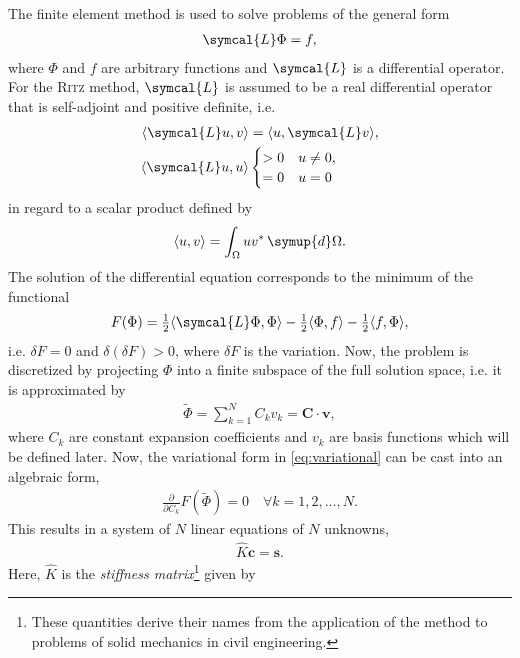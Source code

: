 \documentclass[a4paper, twoside, 10pt, english]{article}
\numberwithin{equation}{section}
\let\vec\symbf
\newcommand*\pd[2][]{\ensuremath{\frac{\partial #1}{\partial #2}}}  %
\begin{document}
The finite element method is used to solve problems of the general form
\begin{gather}
  \symcal{L} \Phi = f, \label{eq:fem}
\end{gather}
where $\Phi$ and $f$ are arbitrary functions and $\symcal{L}$ is a differential operator. For the \textsc{Ritz} method, $\symcal{L}$ is assumed to be a real differential operator that is self-adjoint and positive definite, i.e.
\begin{align}
  \langle \symcal{L} u, v \rangle &= \langle u, \symcal{L} v \rangle, \label{eq:self-adjoint} \\
  \langle \symcal{L} u, u \rangle & \begin{cases}
    > 0 & u \neq 0, \\
    = 0 & u = 0
  \end{cases} \label{eq:positive_definite}
\end{align}
in regard to a scalar product defined by
\begin{gather}
  \langle u, v \rangle = \int_{\Omega} u v^{*} \, \symup{d} \Omega. \label{eq:scalar_prod}
\end{gather}
The solution of the differential equation corresponds to the minimum of the functional
\begin{gather}
  F(\Phi) = \tfrac{1}{2} \langle \symcal{L} \Phi, \Phi \rangle - \tfrac{1}{2} \langle \Phi, f \rangle - \tfrac{1}{2} \langle f, \Phi \rangle, \label{eq:variational}
\end{gather}
i.e. $\delta F = 0$ and $\delta (\delta F) > 0$, where $\delta F$ is the variation. Now, the problem is discretized by projecting $\Phi$ into a finite subspace of the full solution space, i.e. it is approximated by
\begin{gather}
  \tilde{\Phi} = \sum_{k = 1}^{N} C_{k} v_{k} = \vec{C} \cdot \vec{v},
\end{gather}
where $C_{k}$ are constant expansion coefficients and $v_{k}$ are basis functions which will be defined later. Now, the variational form in \cref{eq:variational} can be cast into an algebraic form,
\begin{gather}
  \pd{C_{k}} F(\tilde{\Phi}) = 0 \quad \forall k = 1, 2, \dotsc, N.
\end{gather}
This results in a system of $N$ linear equations of $N$ unknowns,
\begin{gather}
  \hat{K} \vec{c} = \vec{s}. \label{eq:ritz}
\end{gather}
Here, $\hat{K}$ is the \emph{stiffness matrix}\footnote{\label{fn:zienkiewicz}These quantities derive their names from the application of the method to problems of solid mechanics in civil engineering.} given by
\end{document}
